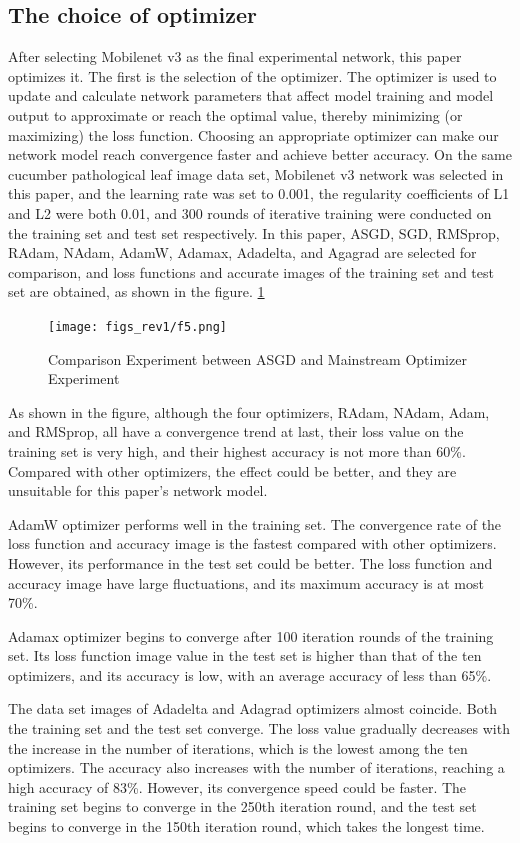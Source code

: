 \documentclass[a4paper,fleqn]{cas-sc}
\begin{document}
\subsection{The choice of optimizer}
After selecting Mobilenet v3 as the final experimental network, this paper optimizes it. The first is the selection of the optimizer. The optimizer is used to update and calculate network parameters that affect model training and model output to approximate or reach the optimal value, thereby minimizing (or maximizing) the loss function. Choosing an appropriate optimizer can make our network model reach convergence faster and achieve better accuracy. On the same cucumber pathological leaf image data set, Mobilenet v3 network was selected in this paper, and the learning rate was set to 0.001, the regularity coefficients of L1 and L2 were both 0.01, and 300 rounds of iterative training were conducted on the training set and test set respectively. In this paper, ASGD, SGD, RMSprop, RAdam, NAdam, AdamW, Adamax, Adadelta, and Agagrad are selected for comparison, and loss functions and accurate images of the training set and test set are obtained, as shown in the figure. \ref{fig:f5}
\begin{figure}
\centering
\texttt{[image: figs\_rev1/f5.png]}
\caption{Comparison Experiment between ASGD and Mainstream Optimizer Experiment}
\label{fig:f5}
\end{figure}

As shown in the figure, although the four optimizers, RAdam, NAdam, Adam, and RMSprop, all have a convergence trend at last, their loss value on the training set is very high, and their highest accuracy is not more than 60\%. Compared with other optimizers, the effect could be better, and they are unsuitable for this paper's network model. 

AdamW optimizer performs well in the training set. The convergence rate of the loss function and accuracy image is the fastest compared with other optimizers. However, its performance in the test set could be better. The loss function and accuracy image have large fluctuations, and its maximum accuracy is at most 70\%. 

Adamax optimizer begins to converge after 100 iteration rounds of the training set. Its loss function image value in the test set is higher than that of the ten optimizers, and its accuracy is low, with an average accuracy of less than 65\%. 

The data set images of Adadelta and Adagrad optimizers almost coincide. Both the training set and the test set converge. The loss value gradually decreases with the increase in the number of iterations, which is the lowest among the ten optimizers. The accuracy also increases with the number of iterations, reaching a high accuracy of 83\%. However, its convergence speed could be faster. The training set begins to converge in the 250th iteration round, and the test set begins to converge in the 150th iteration round, which takes the longest time. 
\end{document}
